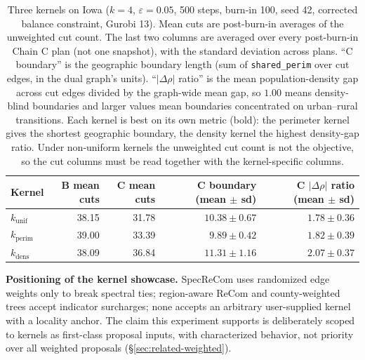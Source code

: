 \documentclass[11pt]{article}
\begin{document}
\begin{table}[H]
\centering
\small
\begin{tabular}{lrrrr}
\toprule
Kernel & B mean cuts & C mean cuts & C boundary (mean $\pm$ sd)
  & C $|\Delta\rho|$ ratio (mean $\pm$ sd) \\
\midrule
$k_{\mathrm{unif}}$  & 38.15 & 31.78 & $10.38 \pm 0.67$ & $1.78 \pm 0.36$ \\
$k_{\mathrm{perim}}$ & 39.00 & 33.39 & $\mathbf{9.89 \pm 0.42}$ & $1.82 \pm 0.39$ \\
$k_{\mathrm{dens}}$  & 38.09 & 36.84 & $11.31 \pm 1.16$ & $\mathbf{2.07 \pm 0.37}$ \\
\bottomrule
\end{tabular}
\caption{Three kernels on Iowa ($k = 4$, $\varepsilon = 0.05$,
  500 steps, burn-in 100, seed 42, corrected balance constraint,
  Gurobi 13). Mean cuts are post-burn-in averages of the unweighted
  cut count. The last two columns are averaged over every post-burn-in
  Chain C plan (not one snapshot), with the standard deviation across
  plans. ``C boundary'' is the geographic boundary length (sum of
  \texttt{shared\_perim} over cut edges, in the dual graph's units).
  ``$|\Delta\rho|$ ratio'' is the mean population-density gap across
  cut edges divided by the graph-wide mean gap, so $1.00$ means
  density-blind boundaries and larger values mean boundaries
  concentrated on urban--rural transitions. Each kernel is best on its
  own metric (bold): the perimeter kernel gives the shortest
  geographic boundary, the density kernel the highest density-gap
  ratio. Under non-uniform kernels the unweighted cut count is not the
  objective, so the cut columns must be read together with the
  kernel-specific columns.}\label{tab:multikernel-iowa}
\end{table}

\textbf{Positioning of the kernel showcase.} SpecReCom uses randomized
edge weights only to break spectral ties; region-aware ReCom and
county-weighted trees accept indicator surcharges; none accepts an
arbitrary user-supplied kernel with a locality anchor. The claim this
experiment supports is deliberately scoped to kernels as first-class
proposal inputs, with characterized behavior, not priority over
all weighted proposals (\S\ref{sec:related-weighted}).
\end{document}
